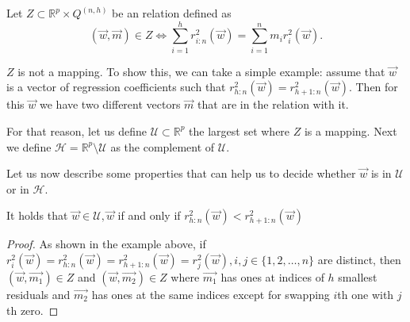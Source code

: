 \begin{definition}
    Let $Z \subset \mathbb{R}^p \times  Q^{(n,h)}$ be an relation defined as
    \begin{equation}
        (\vec{w}, \vec{m}) \in Z \Leftrightarrow \sum\limits_{i=1}^h r_{i:n}^2(\vec{w}) = \sum\limits_{i=1}^n m_i r_{i}^2(\vec{w}).
    \end{equation}
\end{definition}


$Z$ is not a mapping. To show this, we can take a simple example: assume that $\vec{w}$ is a vector of regression coefficients such that $r^{2}_{h:n}(\vec{w}) = r^{2}_{h+1:n}(\vec{w})$. Then for this $\vec{w}$ we have two different vectors $\vec{m}$ that are in the relation with it.

For that reason, let us define  $\mathcal{U} \subset \mathbb{R}^{p}$ the largest set where $Z$ is a mapping. Next we define 
$\mathcal{H} = \mathbb{R}^{p}  \setminus   \mathcal{U}$
as the complement of $\mathcal{U}$.

Let us now describe some properties that can help us to decide whether $\vec{w}$ is in $\mathcal{U}$ or in $\mathcal{H}$.

\begin{lemma} \label{klouda1} It holds that
    $\vec{w} \in \mathcal{U}, \vec{w}$ if and only if 
    $r^{2}_{h:n}(\vec{w}) < r^{2}_{h+1:n}(\vec{w})$
\end{lemma}
\begin{proof}
    As shown in the example above, if $r^{2}_{i}(\vec{w}) = r^{2}_{h:n}(\vec{w}) = r^{2}_{h+1:n}(\vec{w}) = r^{2}_{j}(\vec{w}), i,j \in   \{{1,2,\ldots , n\}}$ are distinct, then $(\vec{w}, \vec{m_1}) \in Z$ and $(\vec{w}, \vec{m_2}) \in Z$ where $\vec{m_1}$ has ones at indices of $h$ smallest residuals and $\vec{m_2}$ has ones at the same indices except for swapping $i$th one with $j$th zero.
\end{proof}

